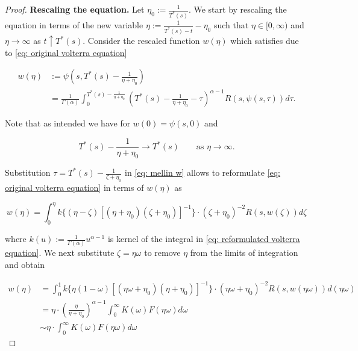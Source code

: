 \documentclass[12pt,twoside]{article}
\theoremstyle{plain}
\theoremstyle{plain}
\theoremstyle{definition}
\theoremstyle{remark}
\numberwithin{equation}{section}
\begin{document}
\begin{proof}

\textbf{Rescaling the equation.} Let $\eta _0 := \frac{1}{T^*(s)}$. We start by rescaling the equation in terms of the new variable $\eta:=\frac{1}{T^*(s)-t} - \eta_0$ such that $\eta \in [0, \infty)$ and $\eta \rightarrow \infty$ as $t \uparrow T^*(s)$. Consider the rescaled function $w(\eta)$ which satisfies due to \eqref{eq: original volterra equation}

\begin{equation}
\label{eq: mellin w}
\begin{aligned}
w(\eta) &:= \psi\left(s, T^*(s) - \frac{1}{\eta + \eta_0}\right) \\[10pt]
&=\frac{1}{\Gamma(\alpha)} \int_{0}^{T^{*}(s)-\frac{1}{\eta+\eta_{0}}}\left(T^{*}(s)-\frac{1}{\eta+\eta_{0}}-\tau\right)^{\alpha-1} R(s, \psi(s, \tau)) d \tau.
\end{aligned}
\end{equation}

\vspace{10pt}

Note that as intended we have for $w(0) = \psi (s, 0)$ and

$$
T^*(s) - \frac{1}{\eta + \eta_0}\rightarrow T^*(s) \qquad \text{as } \eta \rightarrow \infty.
$$

Substitution $\tau = T^*(s) - \frac{1}{\zeta + \eta _0}$ in \eqref{eq: mellin w} allows to reformulate \eqref{eq: original volterra equation} in terms of $w(\eta)$ as

\begin{equation}
\label{eq: reformulated volterra equation}
w(\eta) = \int _0 ^\eta k\{(\eta - \zeta)[(\eta + \eta_0)(\zeta + \eta_0)]^{-1}\} \cdot (\zeta + \eta _0) ^{-2} R(s, w(\zeta)) d\zeta
\end{equation}

where $k(u) := \frac{1}{\Gamma(\alpha)} u^{\alpha - 1}$ is kernel of the integral in \eqref{eq: reformulated volterra equation}. We next substitute $\zeta = \eta \omega$ to remove $\eta$ from the limits of integration and obtain

\begin{equation}
\label{eq: reformulation in terms of mellin convolution}
\begin{aligned}
w(\eta) &= \int_0^1 k\{\eta(1-\omega)[(\eta\omega +\eta_0)(\eta + \eta_0)]^{-1}\} \cdot (\eta \omega + \eta _0) ^{-2} R(s, w(\eta \omega)) d(\eta\omega)\\[10pt]
&= \eta \cdot \left(\frac{\eta}{\eta+\eta_0}\right)^{\alpha-1} \int^\infty_0 K(\omega)F(\eta\omega)d\omega\\[10pt]
&\sim \eta \cdot \int^\infty_0 K(\omega)F(\eta\omega)d\omega
\end{aligned}
\end{equation}


\end{proof}
\end{document}
